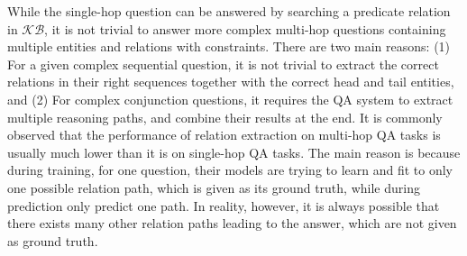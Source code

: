 While the single-hop question can be answered by searching a predicate relation in $\mathcal{KB}$, it is not trivial to answer more complex multi-hop questions containing multiple entities and relations with constraints. There are two main reasons: (1) For a given complex sequential question, it is not trivial to extract the correct relations in their right sequences together with the correct head and tail entities, and (2) For complex conjunction questions, it requires the QA system to extract multiple reasoning paths, and combine their results at the end.  It is commonly observed that the performance of relation extraction on multi-hop QA tasks is usually much lower than it is on single-hop QA tasks. The main reason is because during training, for one question, their models are trying to learn and fit to only one possible relation path, which is given as its ground truth, while during prediction only predict one path. In reality, however, it is always possible that there exists many other relation paths leading to the answer, which are not given as ground truth. %

